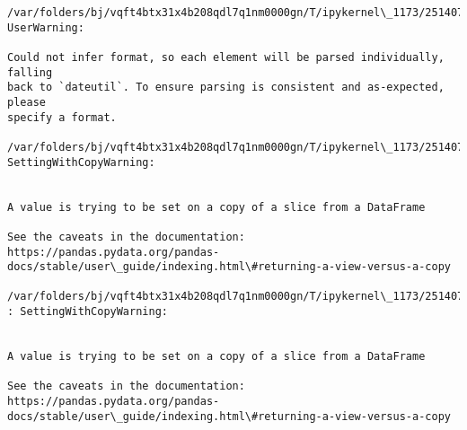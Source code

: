 \documentclass[11pt]{article}
\begin{document}
    \begin{Verbatim}[commandchars=\\\{\}]
/var/folders/bj/vqft4btx31x4b208qdl7q1nm0000gn/T/ipykernel\_1173/2514074313.py:1:
UserWarning:

Could not infer format, so each element will be parsed individually, falling
back to `dateutil`. To ensure parsing is consistent and as-expected, please
specify a format.

/var/folders/bj/vqft4btx31x4b208qdl7q1nm0000gn/T/ipykernel\_1173/2514074313.py:9:
SettingWithCopyWarning:


A value is trying to be set on a copy of a slice from a DataFrame

See the caveats in the documentation: https://pandas.pydata.org/pandas-
docs/stable/user\_guide/indexing.html\#returning-a-view-versus-a-copy

/var/folders/bj/vqft4btx31x4b208qdl7q1nm0000gn/T/ipykernel\_1173/2514074313.py:15
: SettingWithCopyWarning:


A value is trying to be set on a copy of a slice from a DataFrame

See the caveats in the documentation: https://pandas.pydata.org/pandas-
docs/stable/user\_guide/indexing.html\#returning-a-view-versus-a-copy

    \end{Verbatim}
\end{document}
